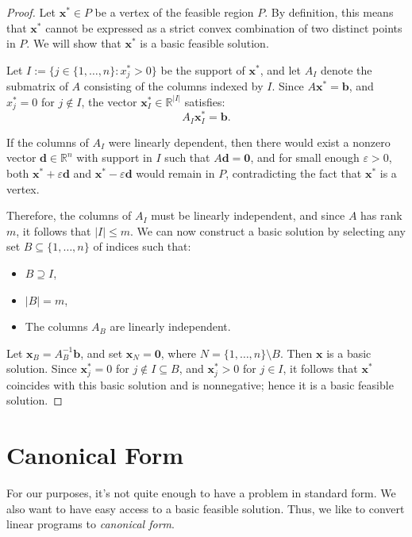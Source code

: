 \begin{proof}
Let \( \mathbf{x}^* \in P \) be a vertex of the feasible region \( P \). By definition, this means that \( \mathbf{x}^* \) cannot be expressed as a strict convex combination of two distinct points in \( P \). We will show that \( \mathbf{x}^* \) is a basic feasible solution.

Let \( I := \{ j \in \{1, \dots, n\} : x^*_j > 0 \} \) be the support of \( \mathbf{x}^* \), and let \( A_I \) denote the submatrix of \( A \) consisting of the columns indexed by \( I \). Since \( A\mathbf{x}^* = \mathbf{b} \), and \( x^*_j = 0 \) for \( j \notin I \), the vector \( \mathbf{x}^*_I \in \mathbb{R}^{|I|} \) satisfies:
\[
A_I \mathbf{x}^*_I = \mathbf{b}.
\]

If the columns of \( A_I \) were linearly dependent, then there would exist a nonzero vector \( \mathbf{d} \in \mathbb{R}^n \) with support in \( I \) such that \( A\mathbf{d} = \mathbf{0} \), and for small enough \( \varepsilon > 0 \), both \( \mathbf{x}^* + \varepsilon \mathbf{d} \) and \( \mathbf{x}^* - \varepsilon \mathbf{d} \) would remain in \( P \), contradicting the fact that \( \mathbf{x}^* \) is a vertex.

Therefore, the columns of \( A_I \) must be linearly independent, and since \( A \) has rank \( m \), it follows that \( |I| \leq m \). We can now construct a basic solution by selecting any set \( B \subseteq \{1, \dots, n\} \) of indices such that:
\begin{itemize}
    \item \( B \supseteq I \),
    \item \( |B| = m \),
    \item The columns \( A_B \) are linearly independent.
\end{itemize}

Let \( \mathbf{x}_B = A_B^{-1} \mathbf{b} \), and set \( \mathbf{x}_N = \mathbf{0} \), where \( N = \{1, \dots, n\} \setminus B \). Then \( \mathbf{x} \) is a basic solution. Since \( \mathbf{x}^*_j = 0 \) for \( j \notin I \subseteq B \), and \( \mathbf{x}^*_j > 0 \) for \( j \in I \), it follows that \( \mathbf{x}^* \) coincides with this basic solution and is nonnegative; hence it is a basic feasible solution.
\end{proof}

\section{Canonical Form}
For our purposes, it's not quite enough to have a problem in standard form.  We also want to have easy access to a basic feasible solution.  Thus, we like to convert linear programs to \emph{canonical form}.

